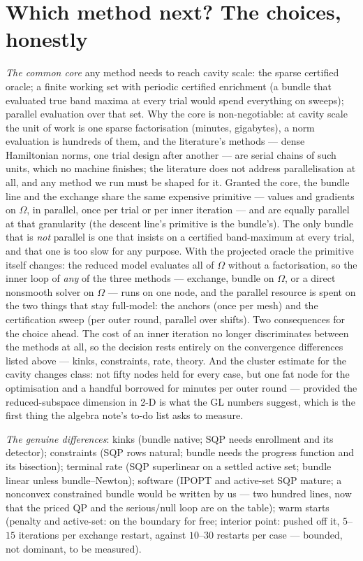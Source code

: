 \documentclass[11pt,a4paper]{article}
\newcommand{\rev}[1]{#1}
\newcommand{\reve}[1]{#1}
\begin{document}
\section{Which method next?  The choices, honestly}
\label{sec:which}

\emph{The common core} any method needs to reach cavity scale: the sparse certified
oracle; a finite working set with periodic certified enrichment (a bundle that evaluated
true band maxima at every trial would spend everything on sweeps); parallel evaluation
over that set.  \rev{Why the core is non-negotiable: at cavity scale the unit of work is one sparse
factorisation (minutes, gigabytes), a norm evaluation is hundreds of them, and the
literature's methods --- dense Hamiltonian norms, one trial design after another ---
are serial chains of such units, which no machine finishes; the literature does not
address parallelisation at all, and any method we run must be shaped for it.  Granted
the core, the bundle line and the exchange share the same expensive primitive --- values
and gradients on $\Omega$, in parallel, once per trial or per inner iteration --- and
are equally parallel at that granularity (the descent line's primitive is the bundle's).
The only bundle that is \emph{not} parallel is one that insists on a certified
band-maximum at every trial, and that one is too slow for any purpose.}
\reve{With the projected oracle the primitive itself changes: the reduced model
evaluates all of $\Omega$ without a factorisation, so the inner loop of \emph{any} of the
three methods --- exchange, bundle on $\Omega$, or a direct nonsmooth solver on
$\Omega$ --- runs on one node, and the parallel resource is spent on the two things
that stay full-model: the anchors (once per mesh) and the certification sweep (per outer
round, parallel over shifts).  Two consequences for the choice ahead.  The cost of an
inner iteration no longer discriminates between the methods at all, so the decision
rests entirely on the convergence differences listed above --- kinks, constraints, rate,
theory.  And the cluster estimate for the cavity changes class: not fifty nodes held
for every case, but one fat node for the optimisation and a handful borrowed for
minutes per outer round --- provided the reduced-subspace dimension in 2-D is what the
GL numbers suggest, which is the first thing the algebra note's to-do list asks to
measure.}

\emph{The genuine differences}: kinks (bundle native; SQP needs enrollment and its
detector); constraints (SQP rows natural; bundle needs the progress function and its
bisection); terminal rate (SQP superlinear on a settled active set; bundle linear unless
bundle--Newton); software (IPOPT and active-set SQP mature; a nonconvex constrained bundle
would be written by us --- two hundred lines, now that the priced QP and the serious/null
loop are on the table); warm starts (penalty and active-set: on the boundary for free;
interior point: pushed off it, $5$--$15$ iterations per exchange restart, against
$10$--$30$ restarts per case --- bounded, not dominant, to be measured).
\end{document}
